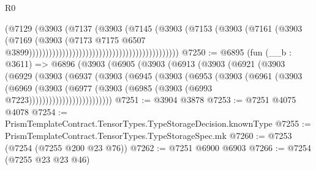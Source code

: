\begin{lexlean}{R0}
\begin{coremodule}
                                                                    (@7129
                                                                      (@3903
                                                                        (@7137
                                                                          (@3903
                                                                            (@7145
                                                                              (@3903
                                                                                (@7153
                                                                                  (@3903
                                                                                    (@7161
                                                                                      (@3903
                                                                                        (@7169
                                                                                          (@3903
                                                                                            (@7173
                                                                                              @7175
                                                                                              @6507
                                                                                              @3899)))))))))))))))))))))))))))))))))))))))))))))
@7250 := @6895
    (fun (__b : @3611) =>
    @6896
      (@3903
        (@6905
          (@3903
            (@6913
              (@3903
                (@6921
                  (@3903
                    (@6929
                      (@3903
                        (@6937
                          (@3903
                            (@6945
                              (@3903
                                (@6953
                                  (@3903
                                    (@6961
                                      (@3903
                                        (@6969
                                          (@3903
                                            (@6977
                                              (@3903
                                                (@6985 (@3903 (@6993 @7223)))))))))))))))))))))))))
@7251 := @3904 @3878
@7253 := @7251 @4075 @4078
@7254 := PrismTemplateContract.TensorTypes.TypeStorageDecision.knownType
@7255 := PrismTemplateContract.TensorTypes.TypeStorageSpec.mk
@7260 := @7253 (@7254 (@7255 @200 @23 @76))
@7262 := @7251 @6900 @6903
@7266 := @7254 (@7255 @23 @23 @46)

\end{coremodule}
\end{lexlean}

